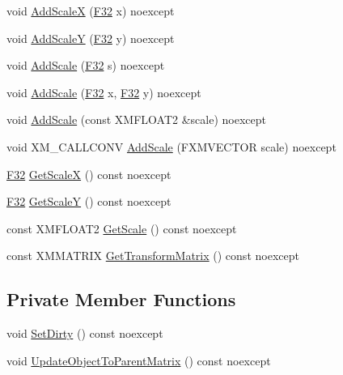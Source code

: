 \begin{DoxyCompactItemize}
\item 
void \hyperlink{classmage_1_1_texture_transform_a6b15e635a3210008086786c274233acb}{Add\+ScaleX} (\hyperlink{namespacemage_aa97e833b45f06d60a0a9c4fc22ae02c0}{F32} x) noexcept
\item 
void \hyperlink{classmage_1_1_texture_transform_a48d0a0ebd014f3fd3d8f30c750763273}{Add\+ScaleY} (\hyperlink{namespacemage_aa97e833b45f06d60a0a9c4fc22ae02c0}{F32} y) noexcept
\item 
void \hyperlink{classmage_1_1_texture_transform_a494965e060dd40a1c86f5493d734c1a7}{Add\+Scale} (\hyperlink{namespacemage_aa97e833b45f06d60a0a9c4fc22ae02c0}{F32} s) noexcept
\item 
void \hyperlink{classmage_1_1_texture_transform_a460f9fb43a5b6390d54ab72425a39ceb}{Add\+Scale} (\hyperlink{namespacemage_aa97e833b45f06d60a0a9c4fc22ae02c0}{F32} x, \hyperlink{namespacemage_aa97e833b45f06d60a0a9c4fc22ae02c0}{F32} y) noexcept
\item 
void \hyperlink{classmage_1_1_texture_transform_a80b32b0570b7d37c702cab606cdbb77a}{Add\+Scale} (const X\+M\+F\+L\+O\+A\+T2 \&scale) noexcept
\item 
void X\+M\+\_\+\+C\+A\+L\+L\+C\+O\+NV \hyperlink{classmage_1_1_texture_transform_a6fa7617e33c123fd09b9f1c7e06afaa1}{Add\+Scale} (F\+X\+M\+V\+E\+C\+T\+OR scale) noexcept
\item 
\hyperlink{namespacemage_aa97e833b45f06d60a0a9c4fc22ae02c0}{F32} \hyperlink{classmage_1_1_texture_transform_a8aba9997f667007fb9b77e14031a1f00}{Get\+ScaleX} () const noexcept
\item 
\hyperlink{namespacemage_aa97e833b45f06d60a0a9c4fc22ae02c0}{F32} \hyperlink{classmage_1_1_texture_transform_a06a3314cef041f0070f7203e1538a2eb}{Get\+ScaleY} () const noexcept
\item 
const X\+M\+F\+L\+O\+A\+T2 \hyperlink{classmage_1_1_texture_transform_a4d6465ef615e8f1fd3b85541892313c8}{Get\+Scale} () const noexcept
\item 
const X\+M\+M\+A\+T\+R\+IX \hyperlink{classmage_1_1_texture_transform_adac9b7f5138ba53538b860cc83ad7e98}{Get\+Transform\+Matrix} () const noexcept
\end{DoxyCompactItemize}
\subsection*{Private Member Functions}
\begin{DoxyCompactItemize}
\item 
void \hyperlink{classmage_1_1_texture_transform_a471542a6be04f39307dd10ba2bb67ce1}{Set\+Dirty} () const noexcept
\item 
void \hyperlink{classmage_1_1_texture_transform_a9c57bc18eead3ce17265ae9cd3a7a8c7}{Update\+Object\+To\+Parent\+Matrix} () const noexcept
\end{DoxyCompactItemize}

